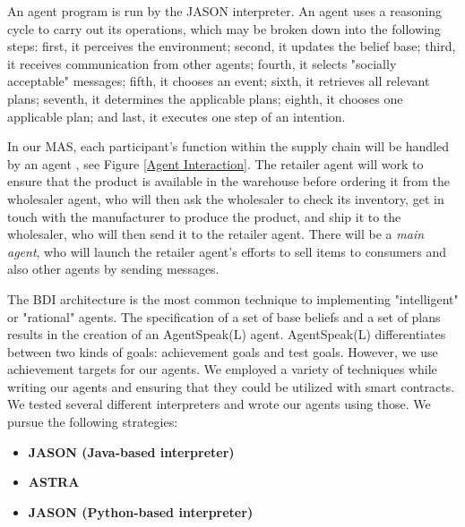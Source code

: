 \vspace{.5cm}

An agent program is run by the JASON interpreter. An agent uses a reasoning cycle to carry out its operations, which may be broken down into the following steps: first, it perceives the environment; second, it updates the belief base; third, it receives communication from other agents; fourth, it selects "socially acceptable" messages; fifth, it chooses an event; sixth, it retrieves all relevant plans; seventh, it determines the applicable plans; eighth, it chooses one applicable plan; and last, it executes one step of an intention.

\vspace{.5cm}

In our \ac{MAS}, each participant's function within the supply chain will be handled by an agent , see Figure \ref{Agent Interaction}. The retailer agent will work to ensure that the product is available in the warehouse before ordering it from the wholesaler agent, who will then ask the wholesaler to check its inventory, get in touch with the manufacturer to produce the product, and ship it to the wholesaler, who will then send it to the retailer agent. There will be a \textit{main agent}, who will launch the retailer agent's efforts to sell items to consumers and also other agents by sending messages.

\vspace{.5cm}

The \ac{BDI} architecture is the most common technique to implementing "intelligent" or "rational" agents. The specification of a set of base beliefs and a set of plans results in the creation of an AgentSpeak(L) agent. AgentSpeak(L) differentiates between two kinds of goals: achievement goals and test goals. However, we use achievement targets for our agents. We employed a variety of techniques while writing our agents and ensuring that they could be utilized with smart contracts. We tested several different interpreters and wrote our agents using those. We pursue the following strategies:

 \vspace{.5cm}
 
\begin{itemize}
    \item \textbf{JASON (Java-based interpreter)}
    
    \vspace{.5cm}
    
    \item \textbf{\ac{ASTRA}}
    
    \vspace{.5cm}
    
    \item \textbf{JASON (Python-based interpreter)}
    
     \vspace{.5cm}
\end{itemize}

